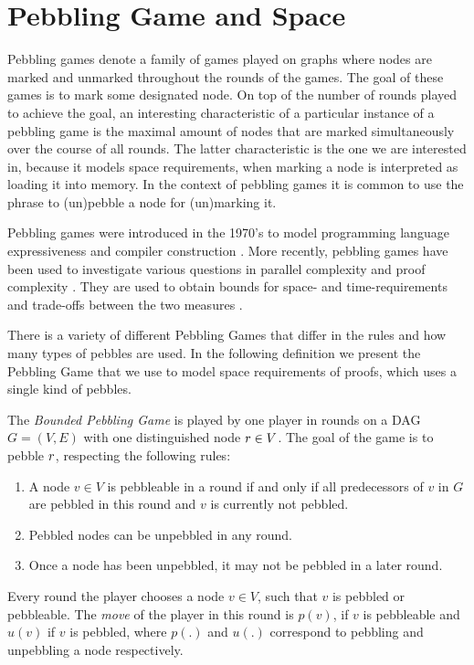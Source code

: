 \section{Pebbling Game and Space}
\label{sec:pebbling-game}

Pebbling games denote a family of games played on graphs where nodes are marked and unmarked throughout the rounds of the games.
The goal of these games is to mark some designated node.
On top of the number of rounds played to achieve the goal, an interesting characteristic of a particular instance of a pebbling game is the maximal amount of nodes that are marked simultaneously over the course of all rounds.
The latter characteristic is the one we are interested in, because it models space requirements, when marking a node is interpreted as loading it into memory.
In the context of pebbling games it is common to use the phrase to (un)pebble a node for (un)marking it.

Pebbling games were introduced in the 1970's to model programming language expressiveness \cite{Pippenger1980,Walker1973} and compiler construction \cite{Sethi1975}. 
More recently, pebbling games have been used to investigate various questions in parallel complexity \cite{Chan2013} and proof complexity \cite{Ben-Sasson2009,Esteban2001,Nordstroem2009}. 
They are used to obtain bounds for space- and time-requirements and trade-offs between the two measures \cite{EmdeBoas1979,Ben-Sasson2002}.

There is a variety of different Pebbling Games that differ in the rules and how many types of pebbles are used.
In the following definition we present the Pebbling Game that we use to model space requirements of proofs, which uses a single kind of pebbles.

\begin{definition}
\label{def:pebbling-game}
The \emph{Bounded Pebbling Game} is played by one player in rounds on a DAG $G = (V,E)$ with one distinguished node $r \in V$.
The goal of the game is to pebble $r$, respecting the following rules:
\begin{enumerate}
	\item \label{rule:premises} A node $v \in V$ is pebbleable in a round if and only if all predecessors of $v$ in $G$ are pebbled in this round and $v$ is currently not pebbled.
	\item \label{rule:unpebbling} Pebbled nodes can be unpebbled in any round.
	\item \label{rule:onlyonce} Once a node has been unpebbled, it may not be pebbled in a later round.
\end{enumerate}
Every round the player chooses a node $v \in V$, such that $v$ is pebbled or pebbleable.
The \emph{move} of the player in this round is $p(v)$, if $v$ is pebbleable and $u(v)$ if $v$ is pebbled, where $p(.)$ and $u(.)$ correspond to pebbling and unpebbling a node respectively.

\end{definition}

